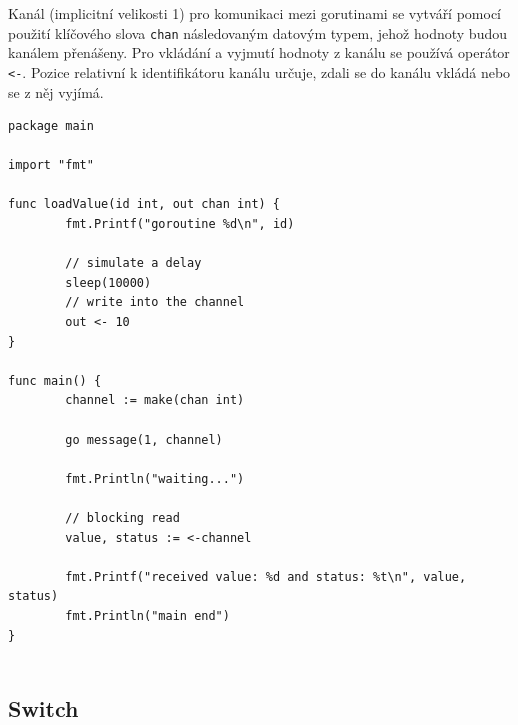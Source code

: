 \documentclass[12pt, a4paper]{article}
\begin{document}
Kanál (implicitní velikosti 1) pro komunikaci mezi gorutinami se vytváří pomocí použití klíčového slova \texttt{chan} následovaným datovým typem, jehož hodnoty budou kanálem přenášeny. Pro vkládání a vyjmutí hodnoty z kanálu se používá operátor \texttt{<-}. Pozice relativní k identifikátoru kanálu určuje, zdali se do kanálu vkládá nebo se z něj vyjímá.


\begin{lstlisting}[caption={Ukázka využití kanálu}, captionpos=b]
package main
 
import "fmt"
 
func loadValue(id int, out chan int) {
        fmt.Printf("goroutine %d\n", id)
 
        // simulate a delay
        sleep(10000)
        // write into the channel 
        out <- 10
}
 
func main() {
        channel := make(chan int)
 
        go message(1, channel)
 
        fmt.Println("waiting...")
 
        // blocking read 
        value, status := <-channel
 
        fmt.Printf("received value: %d and status: %t\n", value, status)
        fmt.Println("main end")
}


\end{lstlisting}



\subsection{Switch}
\end{document}
